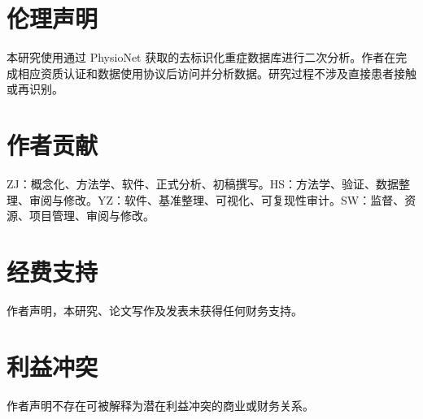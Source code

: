 \documentclass[11pt]{ctexart}
\begin{document}
\section*{伦理声明}
本研究使用通过 PhysioNet 获取的去标识化重症数据库进行二次分析。作者在完成相应资质认证和数据使用协议后访问并分析数据。研究过程不涉及直接患者接触或再识别。

\section*{作者贡献}
ZJ：概念化、方法学、软件、正式分析、初稿撰写。HS：方法学、验证、数据整理、审阅与修改。YZ：软件、基准整理、可视化、可复现性审计。SW：监督、资源、项目管理、审阅与修改。

\section*{经费支持}
作者声明，本研究、论文写作及发表未获得任何财务支持。

\section*{利益冲突}
作者声明不存在可被解释为潜在利益冲突的商业或财务关系。



\end{document}
